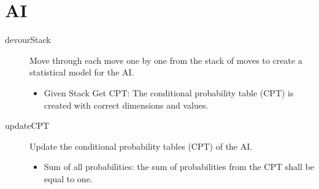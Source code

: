 \section{AI}
\begin{description}
	\item[devourStack] Move through each move one by one from the stack of moves to create a statistical model for the AI.
	\begin{itemize}
		\item Given Stack Get CPT: The conditional probability table (CPT) is created with correct dimensions and values. 
	\end{itemize}
	\item[updateCPT] Update the conditional probability tables (CPT) of the AI.
	\begin{itemize}
		\item Sum of all probabilities: the sum of probabilities from the CPT shall be equal to one.
    \end{itemize}
\end{description}
